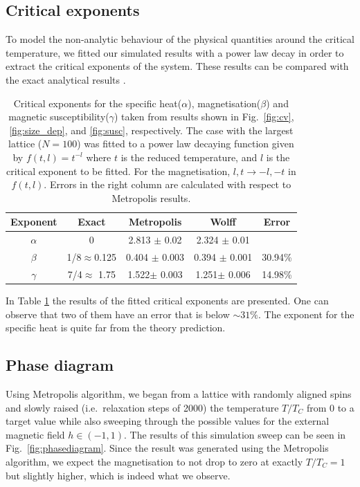 \documentclass[pra,aps,superscriptaddress,amssymb,amsmath,reprint,noeprint,floatfix]{revtex4-2}
\begin{document}
\subsection{\label{subsec:criticalexponents}Critical exponents}
To model the non-analytic behaviour of the physical quantities around the critical temperature, we fitted our simulated results with a power law decay in order to extract the critical exponents of the system. These results can be compared with the exact analytical results \cite{PhysRev.65.117}. 

\begin{table}[h!]
\centering
\begin{tabular}{||c | c | c | c | c||} 
 \hline
 Exponent & Exact & Metropolis & Wolff & Error \\ [0.5ex] 
 \hline\hline
 $\alpha$ & 0 & 2.813 $\pm$ 0.02 & 2.324 $\pm$ 0.01 &  \\ 
 $\beta$ & 1/8$\approx$0.125 & 0.404 $\pm$ 0.003 & 0.394 $\pm$ 0.001 & 30.94\% \\
 $\gamma$ & 7/4$\approx$ 1.75 & 1.522$\pm$ 0.003 & 1.251$\pm$ 0.006 &  14.98\%\\
 \hline
\end{tabular}
\caption{Critical exponents for the specific heat($\alpha$), magnetisation($\beta$) and magnetic susceptibility($\gamma$) taken from results shown in Fig.\ \ref{fig:cv}, \ref{fig:size_dep}, and \ref{fig:susc}, respectively. The case with the largest lattice ($N=100$) was fitted to a power law decaying function given by $f(t,l)=t^{-l}$ where $t$ is the reduced temperature, and $l$ is the critical exponent to be fitted. For the magnetisation, $l,t\rightarrow -l,-t$ in $f(t,l)$. Errors in the right column are calculated with respect to Metropolis results.}
\label{table:1}
\end{table}
 In Table \ref{table:1} the results of the fitted critical exponents are presented. One can observe that two of them have an error that is below $\sim31\%$. The exponent for the specific heat is quite far from the theory prediction.
\subsection{\label{subsec:phasediagram}Phase diagram}

Using Metropolis algorithm, we began from a lattice with randomly aligned spins and slowly raised (i.e.\ relaxation steps of 2000) the temperature $T/T_C$ from 0 to a target value while also sweeping through the possible values for the external magnetic field $h\in(-1,1)$. The results of this simulation sweep can be seen in Fig.\ \ref{fig:phasediagram}. Since the result was generated using the Metropolis algorithm, we expect the magnetisation to not drop to zero at exactly $T/T_C=1$ but slightly higher, which is indeed what we observe.
\end{document}

